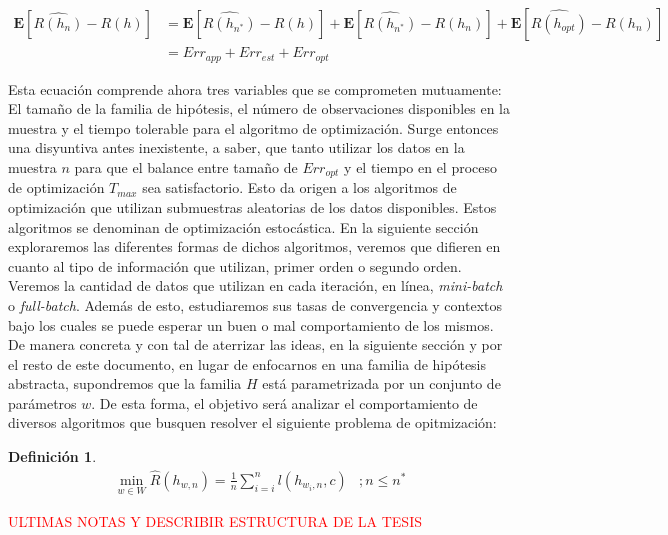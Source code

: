 \documentclass{book}
\theoremstyle{plain}
\theoremstyle{definition}
\newtheorem{defn}{Definición}[section]
\theoremstyle{remark}
\begin{document}
\begin{equation*}
  \begin{split}
    \mathbf{E}[\hat{R(h_{n})} - R(h)] & = \mathbf{E}[\hat{R(h_{n^{*}})} - R(h)] + \mathbf{E}[\hat{R(h_{n^{*}})} - R(h_n)] +  \mathbf{E}[\hat{R(h_{opt})} - R(h_n)]\\
                                     & = Err_{app} + Err_{est} + Err_{opt}
  \end{split}
\end{equation*}

Esta ecuación comprende ahora tres variables que se comprometen mutuamente: El tamaño de la familia de hipótesis, el número de observaciones disponibles en la muestra y el tiempo tolerable para el algoritmo de optimización. Surge entonces una disyuntiva antes inexistente, a saber, que tanto utilizar los datos en la muestra $n$ para que el balance entre tamaño de $Err_{opt}$ y el tiempo en el proceso de optimización $T_{max}$ sea satisfactorio. Esto da origen a los algoritmos de optimización que utilizan submuestras aleatorias de los datos disponibles. Estos algoritmos se denominan de optimización estocástica. En la siguiente sección exploraremos las diferentes formas de dichos algoritmos, veremos que difieren en cuanto al tipo de información que utilizan, primer orden o segundo orden. Veremos la cantidad de datos que utilizan en cada iteración, en línea, \emph{mini-batch} o \emph{full-batch}. Además de esto, estudiaremos sus tasas de convergencia y contextos bajo los cuales se puede esperar un buen o mal comportamiento de los mismos. De manera concreta y con tal de aterrizar las ideas, en la siguiente sección y por el resto de este documento, en lugar de enfocarnos en una familia de hipótesis abstracta, supondremos que la familia $H$ está parametrizada por un conjunto de parámetros $w$. De esta forma, el objetivo será analizar el comportamiento de diversos algoritmos que busquen resolver el siguiente problema de opitmización:

\begin{defn}\label{eq:central_prob}
\begin{equation*}
\begin{split}
\displaystyle\min_{w\in W}\hat{R}(h_{w,n})=\frac{1}{n}\displaystyle\sum_{i=i}^n l(h_{w_i,n},c) &; n\leq n^{*}
\end{split}
\end{equation*}
\end{defn}

\textcolor{red}{ULTIMAS NOTAS Y DESCRIBIR ESTRUCTURA DE LA TESIS}
\end{document}
